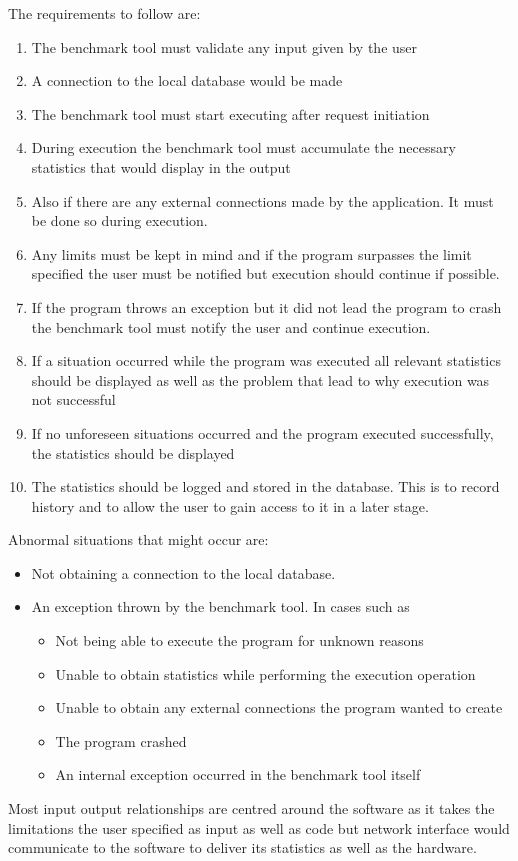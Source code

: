 \documentclass[a4paper,12pt]{article}
\begin{document}
 The requirements to follow are:
\begin{enumerate}
\item The benchmark tool must validate any input given by the user
\item A connection to the local database would be made
\item The benchmark tool must start executing after request initiation
\item During execution the benchmark tool must accumulate the necessary statistics that would display in the output
\item Also if there are any external connections made by the application. It must be done so during execution. 
\item Any limits must be kept in mind and if the program surpasses the limit specified the user must be notified but execution should continue if possible.
\item  If the program throws an exception but it did not lead the program to crash the benchmark tool must notify the user and continue execution.
\item If a situation occurred while the program was executed all relevant statistics should be displayed as well as the problem that lead to why execution was not successful
\item If no unforeseen situations occurred and the program executed successfully, the statistics should be displayed
\item The statistics should be logged and stored in the database. This is to record history and to allow the user to gain access to it in a later stage.
\end{enumerate}

Abnormal situations that might occur are:
\begin{itemize}
\item Not obtaining a connection to the local database. 
\item An exception thrown by the benchmark tool. In cases such as
\begin{itemize}
\item Not being able to execute the program for unknown reasons 
\item Unable to obtain statistics while performing the execution operation
\item Unable to obtain any external connections the program wanted to create
\item The program crashed 
\item An internal exception occurred in the benchmark tool itself
\end{itemize}
 
\end{itemize}
Most input output relationships are centred around the software as it takes the limitations the user specified as input as well as code but network interface would communicate to the software to deliver its statistics as well as the hardware. 
\end{document}
